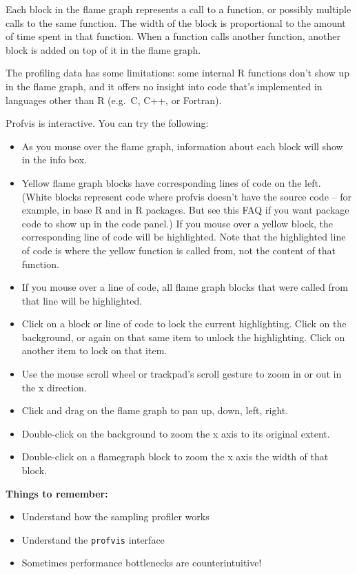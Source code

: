 \documentclass[]{book}
\providecommand{\tightlist}{%
  \setlength{\itemsep}{0pt}\setlength{\parskip}{0pt}}
\theoremstyle{definition}
\theoremstyle{definition}
\theoremstyle{definition}
\theoremstyle{remark}
\begin{document}
Each block in the flame graph represents a call to a function, or
possibly multiple calls to the same function. The width of the block is
proportional to the amount of time spent in that function. When a
function calls another function, another block is added on top of it in
the flame graph.

The profiling data has some limitations: some internal R functions don't
show up in the flame graph, and it offers no insight into code that's
implemented in languages other than R (e.g.~C, C++, or Fortran).

Profvis is interactive. You can try the following:

\begin{itemize}
\tightlist
\item
  As you mouse over the flame graph, information about each block will
  show in the info box.
\item
  Yellow flame graph blocks have corresponding lines of code on the
  left. (White blocks represent code where profvis doesn't have the
  source code -- for example, in base R and in R packages. But see this
  FAQ if you want package code to show up in the code panel.) If you
  mouse over a yellow block, the corresponding line of code will be
  highlighted. Note that the highlighted line of code is where the
  yellow function is called from, not the content of that function.
\item
  If you mouse over a line of code, all flame graph blocks that were
  called from that line will be highlighted.
\item
  Click on a block or line of code to lock the current highlighting.
  Click on the background, or again on that same item to unlock the
  highlighting. Click on another item to lock on that item.
\item
  Use the mouse scroll wheel or trackpad's scroll gesture to zoom in or
  out in the x direction.
\item
  Click and drag on the flame graph to pan up, down, left, right.
\item
  Double-click on the background to zoom the x axis to its original
  extent.
\item
  Double-click on a flamegraph block to zoom the x axis the width of
  that block.
\end{itemize}

\textbf{Things to remember:}

\begin{itemize}
\tightlist
\item
  Understand how the sampling profiler works
\item
  Understand the \texttt{profvis} interface
\item
  Sometimes performance bottlenecks are counterintuitive!
\end{itemize}
\end{document}
